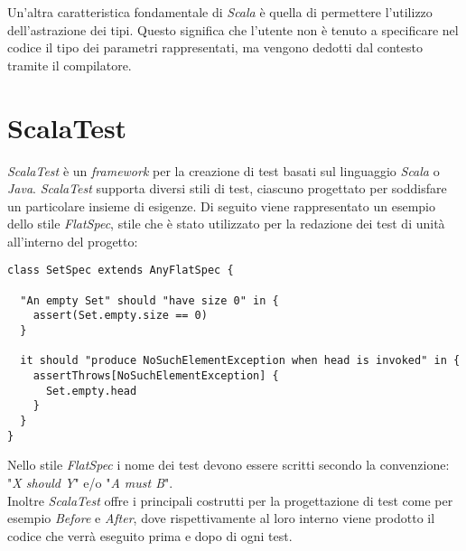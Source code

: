 Un'altra caratteristica fondamentale di \textit{Scala} è quella di permettere l'utilizzo dell'astrazione dei tipi. Questo significa che l'utente non è tenuto a specificare nel codice il tipo dei parametri rappresentati, ma vengono dedotti dal contesto tramite il compilatore.



\section{ScalaTest}\label{sec:scala-test}
\textit{ScalaTest} è un \textit{\textit{\gls{framework}}} per la creazione di test basati sul linguaggio \textit{Scala} o \textit{Java}. \textit{ScalaTest} supporta diversi stili di test, ciascuno progettato per soddisfare un particolare insieme di esigenze. Di seguito viene rappresentato un esempio dello stile \textit{FlatSpec}, stile che è stato utilizzato per la redazione dei test di unità all'interno del progetto:

\begin{verbatim}
class SetSpec extends AnyFlatSpec {

  "An empty Set" should "have size 0" in {
    assert(Set.empty.size == 0)
  }

  it should "produce NoSuchElementException when head is invoked" in {
    assertThrows[NoSuchElementException] {
      Set.empty.head
    }
  }
}
\end{verbatim}

Nello stile \textit{FlatSpec} i nome dei test devono essere scritti secondo la convenzione: "\textit{X should Y}" e/o "\textit{A must B}".\\
Inoltre \textit{ScalaTest} offre i principali costrutti per la progettazione di test come per esempio \textit{Before} e \textit{After}, dove rispettivamente al loro interno viene  prodotto il codice che verrà eseguito prima e dopo di ogni test.

